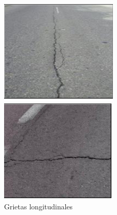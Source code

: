 \begin{figure}[ht!]
	\centering
	\begin{minipage}{0.3\linewidth}
		\centering
		\includegraphics[width=\linewidth]{figs/glon.png}
		\caption*{\centering Grietas longitudinales }
	\end{minipage}
	\hspace{0.5 cm}
	\begin{minipage}{0.3\linewidth}
		\centering
		\includegraphics[width=\linewidth]{figs/gtran.png}

\end{minipage}
\end{figure}
